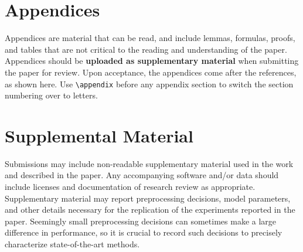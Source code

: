 \documentclass[11pt,a4paper]{article}
\begin{document}
\section{Appendices}
\label{sec:appendix}
Appendices are material that can be read, and include lemmas, formulas, proofs, and tables that are not critical to the reading and understanding of the paper. 
Appendices should be \textbf{uploaded as supplementary material} when submitting the paper for review. Upon acceptance, the appendices come after the references, as shown here. Use
\verb|\appendix| before any appendix section to switch the section
numbering over to letters.


\section{Supplemental Material}
\label{sec:supplemental}
Submissions may include non-readable supplementary material used in the work and described in the paper. Any accompanying software and/or data should include licenses and documentation of research review as appropriate. Supplementary material may report preprocessing decisions, model parameters, and other details necessary for the replication of the experiments reported in the paper. Seemingly small preprocessing decisions can sometimes make a large difference in performance, so it is crucial to record such decisions to precisely characterize state-of-the-art methods. 
\end{document}
